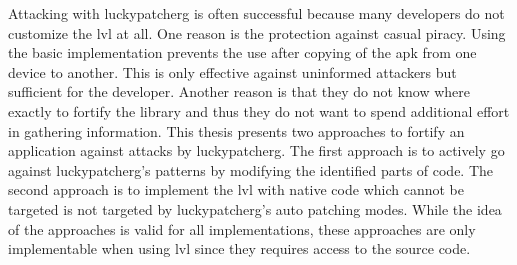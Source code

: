 Attacking with \gls{luckypatcherg} is often successful because many developers do not customize the \gls{lvl} at all.
One reason is the protection against casual piracy.
Using the basic implementation prevents the use after copying of the \gls{apk} from one device to another.
This is only effective against uninformed attackers but sufficient for the developer.
Another reason is that they do not know where exactly to fortify the library and thus they do not want to spend additional effort in gathering information. \cite{developersSecuring} \cite{munteanLicense}
This thesis presents two approaches to fortify an application against attacks by \gls{luckypatcherg}.
\newline
The first approach is to actively go against \gls{luckypatcherg}'s patterns by modifying the identified parts of code.
\newline
The second approach is to implement the \gls{lvl} with native code which cannot be targeted is not targeted by \gls{luckypatcherg}'s auto patching modes.
\newline
While the idea of the approaches is valid for all implementations, these approaches are only implementable when using \gls{lvl} since they requires access to the source code.
